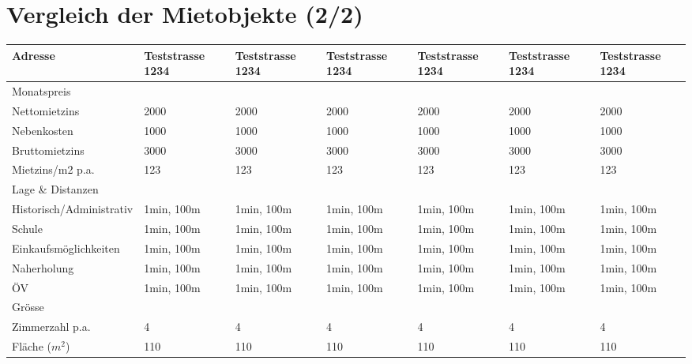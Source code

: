\documentclass{article}
\begin{document}
	\section{Vergleich der Mietobjekte (2/2)}
	\begin{table}[!htbp]
		\begin{flushleft}
			\renewcommand{\arraystretch}{1.1}
			\setlength{\tabcolsep}{10pt}
			\begin{tabular}{ |l|l|l|l|l|l|l| } 
				\hline
				Adresse & \cellcolor{lightgray} Teststrasse 1234 & Teststrasse 1234 & Teststrasse 1234 & Teststrasse 1234 & Teststrasse 1234 & Teststrasse 1234 \\ 
				\hline
				\rowcolor{gray} Monatspreis & & & & & &  \\ 
				\hline
				Nettomietzins & \cellcolor{lightgray} 2000 & 2000 & 2000 & 2000 & 2000 & 2000\\ 
				\hline
				Nebenkosten & \cellcolor{lightgray} 1000 & 1000 & 1000 & 1000 & 1000 & 1000 \\ 
				\hline
				Bruttomietzins & \cellcolor{lightgray} 3000 & 3000 & 3000 & 3000 & 3000 & 3000 \\ 
				\hline
				Mietzins/m2 p.a. & \cellcolor{lightgray} 123 & 123 & 123 & 123 & 123 & 123 \\ 
				\hline
				\rowcolor{gray} Lage \& Distanzen & & & & & &  \\ 
				\hline
				Historisch/Administrativ & \cellcolor{lightgray} 1min, 100m & 1min, 100m & 1min, 100m & 1min, 100m & 1min, 100m & 1min, 100m \\ 
				\hline
				Schule & \cellcolor{lightgray} 1min, 100m & 1min, 100m & 1min, 100m & 1min, 100m & 1min, 100m & 1min, 100m \\ 
				\hline
				Einkaufsmöglichkeiten & \cellcolor{lightgray} 1min, 100m & 1min, 100m & 1min, 100m & 1min, 100m & 1min, 100m & 1min, 100m \\ 
				\hline
				Naherholung & \cellcolor{lightgray} 1min, 100m & 1min, 100m & 1min, 100m & 1min, 100m & 1min, 100m & 1min, 100m \\ 
				\hline
				ÖV & \cellcolor{lightgray} 1min, 100m & 1min, 100m & 1min, 100m & 1min, 100m & 1min, 100m & 1min, 100m \\ 
				\hline
				\rowcolor{gray} Grösse & & & & & &  \\ 
				\hline
				Zimmerzahl p.a. & \cellcolor{lightgray} 4 & 4 & 4 & 4 & 4 & 4 \\ 
				\hline
				Fläche ($m^2$) & \cellcolor{lightgray} 110 & 110 & 110 & 110 & 110 & 110 \\ 

\end{tabular}
\end{flushleft}
\end{table}
\end{document}
